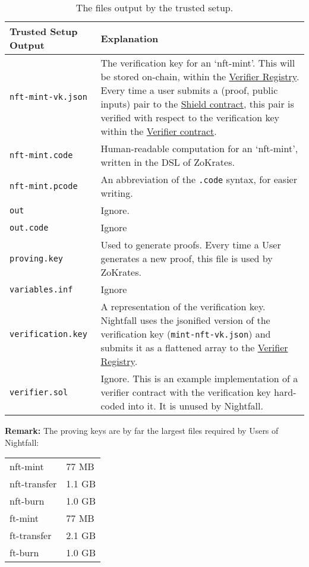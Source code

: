 \begin{table}[h]
	\begin{center}
		\begin{tabular}[t]{L{0.2\textwidth}L{0.7\textwidth}}
			\toprule
			Trusted Setup Output & Explanation  \\ \midrule 
			\texttt{nft-mint-vk.json} & The verification key for an `nft-mint'. This will be stored on-chain, within the \hyperref[sec:smartContracts]{Verifier Registry}. Every time a user submits a (proof, public inputs) pair to the \hyperref[sec:smartContracts]{Shield contract}, this pair is verified with respect to the verification key within the \hyperref[sec:smartContracts]{Verifier contract}.
			\\
			\texttt{nft-mint.code} & Human-readable computation for an `nft-mint', written in the DSL of ZoKrates.
			\\
			\texttt{nft-mint.pcode} & An abbreviation of the \texttt{.code} syntax, for easier writing.
			\\
			\texttt{out} & Ignore. \\
			\texttt{out.code} & Ignore 
			\\
			\texttt{proving.key} & Used to generate proofs. Every time a User generates a new proof, this file is used by ZoKrates. 
			\\
			\texttt{variables.inf} & Ignore 
			\\
			\texttt{verification.key} & A representation of the verification key. Nightfall uses the jsonified version of the verification key (\texttt{mint-nft-vk.json}) and submits it as a flattened array to the \hyperref[sec:smartContracts]{Verifier Registry}.
			\\
			\texttt{verifier.sol} & Ignore.  This is an example implementation of a verifier contract with the verification key hard-coded into it.  It is unused by Nightfall. \\ \bottomrule
		\end{tabular}
	\end{center}
\caption{The files output by the trusted setup.}
\label{table:trustedoutput}
\end{table}

\textbf{Remark:}
The proving keys are by far the largest files required by Users of Nightfall:
\begin{center}
\begin{tabular}{ll}
	nft-mint & 77 MB\\
	nft-transfer & 1.1 GB\\
	nft-burn & 1.0 GB\\
	ft-mint & 77 MB\\
	ft-transfer & 2.1 GB\\
	ft-burn & 1.0 GB\\
\end{tabular}
\end{center}


